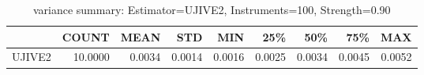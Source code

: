 \begin{table}[ht]
\centering
\caption{variance summary: Estimator=UJIVE2, Instruments=100, Strength=0.90}
\begin{tabular}{lrrrrrrrr}
\toprule
 & COUNT & MEAN & STD & MIN & 25\% & 50\% & 75\% & MAX \\
\midrule
UJIVE2 & 10.0000 & 0.0034 & 0.0014 & 0.0016 & 0.0025 & 0.0034 & 0.0045 & 0.0052 \\
\bottomrule
\end{tabular}
\end{table}
